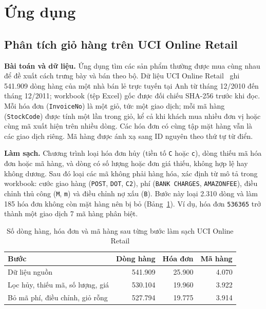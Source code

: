 \section{Ứng dụng}
\label{sec:apps}

\subsection{Phân tích giỏ hàng trên UCI Online Retail}
\label{sec:app-basket}


\textbf{Bài toán và dữ liệu.} Ứng dụng tìm các sản phẩm thường được mua cùng nhau để đề xuất cách trưng bày và
bán theo bộ. Dữ liệu UCI Online Retail~\cite{chen2015onlineretail} ghi 541.909 dòng hàng của một nhà bán lẻ trực
tuyến tại Anh từ tháng 12/2010 đến tháng 12/2011; workbook (tệp Excel) gốc được đối chiếu SHA-256 trước khi đọc. Mỗi hóa đơn
(\texttt{InvoiceNo}) là một giỏ, tức một giao dịch; mỗi mã hàng (\texttt{StockCode}) được tính một lần trong giỏ, kể
cả khi khách mua nhiều đơn vị hoặc cùng mã xuất hiện trên nhiều dòng. Các hóa đơn có cùng tập mặt hàng vẫn là các
giao dịch riêng. Mã hàng được ánh xạ sang ID nguyên theo thứ tự từ điển.

\textbf{Làm sạch.} Chương trình loại hóa đơn hủy (tiền tố \texttt{C} hoặc \texttt{c}), dòng thiếu mã hóa đơn hoặc
mã hàng, và dòng có số lượng hoặc đơn giá thiếu, không hợp lệ hay không dương. Sau đó loại các mã không phải hàng
hóa, xác định từ mô tả trong workbook: cước giao hàng (\texttt{POST}, \texttt{DOT}, \texttt{C2}), phí
(\texttt{BANK CHARGES}, \texttt{AMAZONFEE}), điều chỉnh thủ công (\texttt{M}, \texttt{m}) và điều chỉnh nợ xấu
(\texttt{B}). Bước này loại 2.310 dòng và làm 185 hóa đơn không còn mặt hàng nên bị bỏ (Bảng~\ref{tab:retail-clean}).
Ví dụ, hóa đơn \texttt{536365} trở thành một giao dịch 7 mã hàng phân biệt.

\begin{table}[t]
\caption{Số dòng hàng, hóa đơn và mã hàng sau từng bước làm sạch UCI Online Retail}
\label{tab:retail-clean}
\centering
\footnotesize
\setlength{\tabcolsep}{3pt}
\begin{tabular}{@{}lrrr@{}}
\toprule
Bước & Dòng hàng & Hóa đơn & Mã hàng \\
\midrule
Dữ liệu nguồn & 541.909 & 25.900 & 4.070 \\
Lọc hủy, thiếu mã, số lượng, giá & 530.104 & 19.960 & 3.922 \\
Bỏ mã phí, điều chỉnh, giỏ rỗng & 527.794 & 19.775 & 3.914 \\
\bottomrule
\end{tabular}
\end{table}

